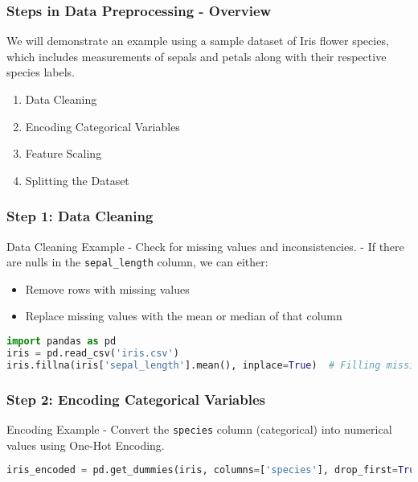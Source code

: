 \documentclass[aspectratio=169]{beamer}
\begin{document}
\begin{frame}[fragile]
  \frametitle{Steps in Data Preprocessing - Overview}
  
  We will demonstrate an example using a sample dataset of Iris flower species, which includes measurements of sepals and petals along with their respective species labels.
  
  \begin{enumerate}
    \item Data Cleaning
    \item Encoding Categorical Variables
    \item Feature Scaling
    \item Splitting the Dataset
  \end{enumerate}
\end{frame}

\begin{frame}[fragile]
  \frametitle{Step 1: Data Cleaning}
  
  \begin{block}{Data Cleaning Example}
    - Check for missing values and inconsistencies.
    - If there are nulls in the \texttt{sepal\_length} column, we can either:
      \begin{itemize}
        \item Remove rows with missing values
        \item Replace missing values with the mean or median of that column
      \end{itemize}
  \end{block}
  
  \begin{lstlisting}[language=Python]
import pandas as pd
iris = pd.read_csv('iris.csv')
iris.fillna(iris['sepal_length'].mean(), inplace=True)  # Filling missing values
  \end{lstlisting}
\end{frame}

\begin{frame}[fragile]
  \frametitle{Step 2: Encoding Categorical Variables}
  
  \begin{block}{Encoding Example}
    - Convert the \texttt{species} column (categorical) into numerical values using One-Hot Encoding.
  \end{block}
  
  \begin{lstlisting}[language=Python]
iris_encoded = pd.get_dummies(iris, columns=['species'], drop_first=True)
  \end{lstlisting}
\end{frame}
\end{document}

